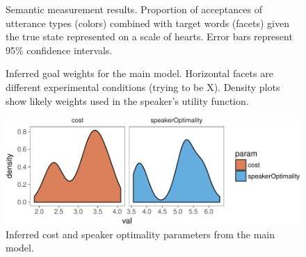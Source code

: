 \documentclass[12pt]{article}
\newcommand{\beginsupplement}{%
        \setcounter{table}{0}
        \renewcommand{\thetable}{S\arabic{table}}%
        \setcounter{figure}{0}
        \renewcommand{\thefigure}{S\arabic{figure}}%
     }
\begin{document}
\setcounter{figure}{0}    
\beginsupplement

\begin{figure}[h]
\centering
\caption{\label{fig:litSem}Semantic measurement results. Proportion of
acceptances of utterance types (colors) combined with target words
(facets) given the true state represented on a scale of hearts. Error
bars represent 95\% confidence intervals.}
\end{figure}

\begin{figure}
\centering
\caption{\label{fig:goalWeights}Inferred goal weights for the main model. 
Horizontal facets are different experimental conditions (trying to be X). 
Density plots show likely weights used in the speaker's utility function.}
\end{figure}

\begin{figure}
\centering
\includegraphics{politeness_files/figure-latex/params-1.pdf}
\caption{\label{fig:params}Inferred cost and speaker optimality parameters
from the main model.}
\end{figure}
\end{document}
